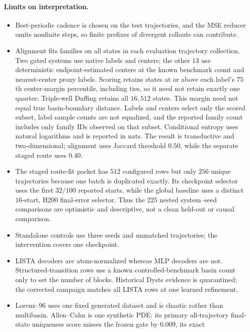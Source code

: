 \paragraph{Limits on interpretation.}
\begin{itemize}
  \item Best-periodic cadence is chosen on the test trajectories, and the MSE
  reducer omits nonfinite steps, so finite prefixes of divergent rollouts can
  contribute.
  \item Alignment fits families on all states in each evaluation trajectory
  collection.  Two gated systems use native labels and centers; the other
  \(13\) use deterministic endpoint-estimated centers at the known benchmark
  count and nearest-center proxy labels.  Scoring retains states at or above
  each label's \(75\)th center-margin percentile, including ties, so it need
  not retain exactly one quarter; Triple-well Duffing retains all \(16{,}512\)
  states.  This margin need not equal true basin-boundary distance.  Labels
  and centers select only the scored subset, label sample counts are not
  equalized, and the reported family count includes only family IDs observed
  on that subset.  Conditional entropy uses natural logarithms and is reported
  in nats.  The result is transductive and two-dimensional; alignment uses
  Jaccard threshold \(0.50\), while the separate staged route uses \(0.40\).
  \item The staged route-fit packet has \(512\) configured rows but only
  \(256\) unique trajectories because one batch is duplicated exactly.  Its
  checkpoint selector uses the first \(32/100\) reported starts, while the
  global baseline uses a distinct \(16\)-start, H200 final-error selector.
  Thus the \(225\) nested system--seed comparisons are optimistic and
  descriptive, not a clean held-out or causal comparison.
  \item Standalone controls use three seeds and unmatched trajectories; the
  intervention covers one checkpoint.
  \item LISTA decoders are atom-normalized whereas MLP decoders are not.
  Structured-transition rows use a known controlled-benchmark basin count only
  to set the number of blocks. Historical Dysts evidence is quarantined; the
  corrected campaign matches all LISTA rows at one learned refinement.
  \item Lorenz--96 uses one fixed generated dataset and is chaotic rather than
  multibasin.  Allen--Cahn is one synthetic PDE: its primary all-trajectory
  final-state uniqueness score misses the frozen gate by \(0.009\), its exact

\end{itemize}
